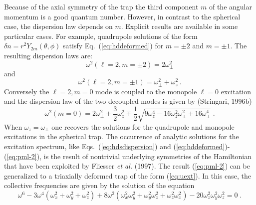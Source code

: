 Because of the axial symmetry of the trap the third component $m$ of
the angular momentum is a good quantum number. However, in contrast to
the spherical case, the
dispersion law   depends on $m$. Explicit results are available
in some particular cases. For example, quadrupole solutions of the form
$\delta n = r^2 Y_{2 m}(\theta,\phi)$ satisfy Eq.~(\ref{eq:hddeformed})
for $m=\pm 2$ and $m=\pm 1$. The  resulting dispersion laws are:
\begin{equation}
\omega^2(\ell=2, m=\pm 2) = 2\omega_{\perp}^2
\label{eq:pml}
\end{equation}
and
\begin{equation}
\omega^2(\ell=2,m=\pm 1) = \omega_{\perp}^2 +\omega_z^2 \, .
\label{eq:pml-1}
\end{equation}
Conversely the $\ell=2, m=0$ mode is  coupled to the monopole $\ell=0$
excitation and  the  dispersion law of the two decoupled modes is given by
(Stringari, 1996b)
\begin{equation}
\omega^2(m=0) = 2\omega_{\perp}^2  + \frac{3}{2}\omega_z^2
\mp\frac{1}{2}
\sqrt{9\omega_z^4-16\omega_z^2\omega_{\perp}^2+16\omega_{\perp}^4} \; .
\label{eq:pml-2}
\end{equation}
 When $\omega_z=\omega_{\perp}$
one recovers the solutions for the quadrupole and monopole excitations
in the spherical trap. The occurrence of analytic solutions for the 
excitation spectrum, like Eqs.~(\ref{eq:hdsdispersion}) and 
(\ref{eq:hddeformed})-(\ref{eq:pml-2}), is the result of nontrivial 
underlying symmetries of the Hamiltonian that have been exploited
by Fliesser {\it et al.} (1997). The result (\ref{eq:pml-2}) can be 
generalized to a triaxially deformed trap of the form (\ref{eq:uext}).
In this case, the collective frequencies are given by the solution of
the equation
\begin{equation}
\omega^6 - 3 \omega^4 (\omega_x^2 + \omega_y^2 +\omega_z^2) 
+ 8 \omega^2 (\omega_x^2 \omega_y^2 +\omega_y^2 \omega_z^2 
+ \omega_z^2 \omega_x^2 ) - 20 \omega_z^2 \omega_y^2 \omega_z^2
= 0 \; . 
\label{eq:triaxial}
\end{equation} 

